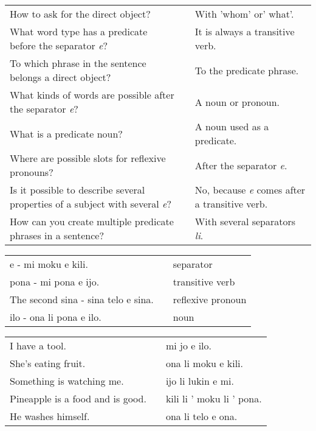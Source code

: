 \begin{supertabular}{p{5,5cm}|ll}
    How to ask for the direct object?                                                   &  & With 'whom' or' what'.                                \\
    What word type has a predicate before the separator \textit{e}?                     &  & It is always a transitive verb.                       \\
    To which phrase in the sentence belongs a direct object?                            &  & To the predicate phrase.                              \\
    What kinds of words are possible after the separator \textit{e}?                    &  & A noun or pronoun.                                    \\
    What is a predicate noun?                                                           &  & A noun used as a predicate.                           \\
    Where are possible slots for reflexive pronouns?                                    &  & After the separator \textit{e}.                       \\
    Is it possible to describe several properties of a subject with several \textit{e}? &  & No, because \textit{e} comes after a transitive verb. \\
    How can you create multiple predicate phrases in a sentence?                        &  & With several separators \textit{li}.                  \\
\end{supertabular}

\begin{supertabular}{p{5,5cm}|ll}
    e - mi moku e kili.                 &  & separator         \\
    pona - mi pona e ijo.               &  & transitive verb   \\
    The second sina - sina telo e sina. &  & reflexive pronoun \\
    ilo - ona li pona e ilo.            &  & noun              \\
\end{supertabular}

\begin{supertabular}{p{5,5cm}|ll}
    I have a tool.                   &  & mi jo e ilo.              \\
    She's eating fruit.              &  & ona li moku e kili.       \\
    Something is watching me.        &  & ijo li lukin e mi.        \\
    Pineapple is a food and is good. &  & kili li ' moku li ' pona. \\
    He washes himself.               &  & ona li telo e ona.        \\
\end{supertabular}

